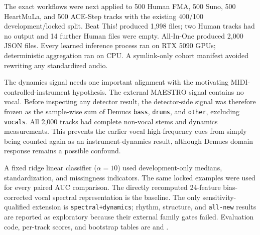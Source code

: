 The exact workflows were next applied to 500 Human FMA, 500 Suno, 500
HeartMuLa, and 500 ACE-Step tracks with the existing 400/100
development/locked split.  Beat This! produced 1,998 files; two Human tracks
had no output and 14 further Human files were empty.  All-In-One produced
2,000 JSON files.  Every learned inference process ran on RTX 5090 GPUs;
deterministic aggregation ran on CPU.  A symlink-only cohort manifest avoided
rewriting any standardized audio.

The dynamics signal needs one important alignment with the motivating
MIDI-controlled-instrument hypothesis.  The external MAESTRO signal contains
no vocal.  Before inspecting any detector result, the detector-side signal was
therefore frozen as the sample-wise sum of Demucs \texttt{bass},
\texttt{drums}, and \texttt{other}, excluding \texttt{vocals}.  All 2,000
tracks had complete non-vocal stems and dynamics measurements.  This prevents
the earlier vocal high-frequency cues from simply being counted again as an
instrument-dynamics result, although Demucs domain response remains a possible
confound.

A fixed ridge linear classifier ($\alpha=10$) used development-only medians,
standardization, and missingness indicators.  The same locked examples were
used for every paired AUC comparison.  The directly recomputed 24-feature
bias-corrected vocal spectral representation is the baseline.  The only
sensitivity-qualified extension is \texttt{spectral+dynamics}; rhythm,
structure, and \texttt{all-new} results are reported as exploratory because
their external family gates failed.  Evaluation code, per-track scores, and
bootstrap tables are  and .

\begin{table}[H]
\centering
\footnotesize
\caption{Locked ROC-AUC of the externally qualified dynamics extension and
the exploratory all-new representation.  Delta and CI compare
\texttt{spectral+dynamics} with the spectral baseline on identical tracks.}
\label{tab:change-detector-extension}
\end{table}

